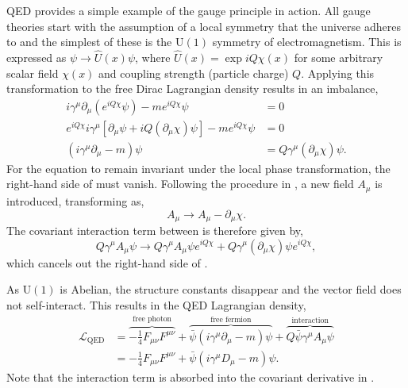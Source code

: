 QED provides a simple example of the gauge principle in action.
All gauge theories start with the assumption of a local symmetry that the universe adheres to and the simplest of these is the $\text{U}(1)$ symmetry of electromagnetism.
This is expressed as $\psi \rightarrow \hat U(x) \psi$, where $\hat U(x) = \exp{i Q \chi(x)}$ for some arbitrary scalar field $\chi(x)$ and coupling strength (particle charge) $Q$.
Applying this transformation to the free Dirac Lagrangian density results in an imbalance,
\begin{align}
	i \gamma^\mu \partial_\mu ( e^{i Q \chi} \psi ) - m e^{i Q \chi}  \psi                                          & = 0                                      \\
	e^{i Q \chi} i \gamma^\mu \left[ \partial_\mu \psi + i Q (\partial_\mu \chi) \psi \right] - m e^{i Q \chi} \psi & = 0                                      \\
	(i \gamma^\mu \partial_\mu - m) \psi                                                                            & = Q \gamma^\mu (\partial_\mu \chi) \psi.
	\label{eq:imbalanced_dirac}
\end{align}
For the equation to remain invariant under the local phase transformation, the right-hand side of  must vanish.
Following the procedure in , a new field $A_\mu$ is introduced, transforming as,
\begin{equation}
	\label{eq:photon_transformation}
	A_\mu \rightarrow A_\mu - \partial_\mu \chi.
\end{equation}
The covariant interaction term between is therefore given by,
\begin{equation}
	\label{eq:qed_interaction}
	Q \gamma ^\mu A_\mu \psi \rightarrow Q \gamma^\mu A_\mu \psi e^{i Q \chi} + Q \gamma^\mu (\partial_\mu \chi) \psi e^{i Q \chi},
\end{equation}
which cancels out the right-hand side of .

As $\text{U}(1)$ is Abelian, the structure constants disappear and the vector field does not self-interact.
This results in the QED Lagrangian density,
\begin{align}
	\mathcal{L}_\text{QED} & = \overbrace{-\frac{1}{4} F_{\mu\nu} F^{\mu\nu}}^{\text{free photon}} + \overbrace{\bar \psi (i \gamma^\mu \partial_\mu - m) \psi}^{\text{free fermion}} + \overbrace{Q \bar \psi \gamma^\mu A_\mu \psi}^{\text{interaction}} \\
	                       & = -\frac{1}{4} F_{\mu\nu} F^{\mu\nu} + \bar \psi (i \gamma^\mu D_\mu - m) \psi.
	\label{eq:qed_lagrangian}
\end{align}
Note that the interaction term is absorbed into the covariant derivative in .

